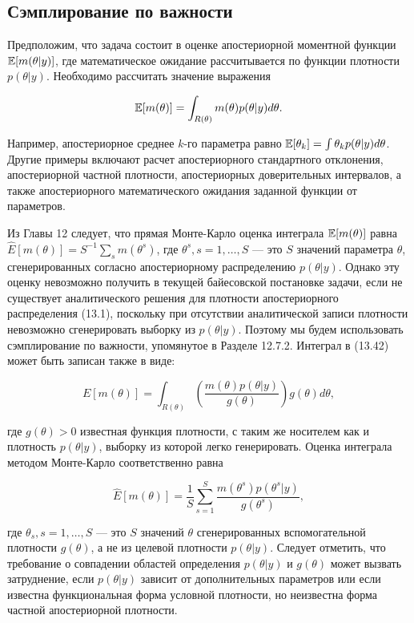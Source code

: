 \subsection{Сэмплирование по важности}

Предположим, что задача состоит в оценке апостериорной  моментной функции $\mathbb{E}[m(\theta|y)]$, где математическое ожидание рассчитывается по функции плотности $p(\theta|y)$. Необходимо рассчитать значение выражения

\begin{equation}
\mathbb{E}[m(\theta)]=\int_{R(\theta)}m(\theta)p(\theta|y)d\theta.
\end{equation}

Например, апостериорное среднее $k$-го параметра  равно $\mathbb{E}[\theta_k]=\int{\theta_{k}}p(\theta|y)d\theta$. Другие примеры включают  расчет апостериорного стандартного отклонения,  апостериорной частной плотности, апостериорных доверительных интервалов, а также апостериорного математического ожидания заданной функции от параметров.


Из Главы 12 следует, что прямая Монте-Карло оценка интеграла $\mathbb{E}[m(\theta)]$ равна $\hat{E}[m(\theta)]=S^{-1}\sum_{s}m(\theta^s)$, где $\theta^s, s=1,\ldots ,S$ --- это $S$ значений параметра $\theta$, сгенерированных согласно  апостериорному распределению $p(\theta|y)$. Однако эту оценку невозможно получить в текущей байесовской постановке задачи, если не существует аналитического решения для плотности апостериорного распределения (13.1), поскольку при отсутствии аналитической записи плотности невозможно сгенерировать выборку из $p(\theta|y)$. Поэтому мы будем использовать сэмплирование по важности, упомянутое в Разделе 12.7.2. Интеграл в (13.42) может быть записан также в виде:

\begin{equation}
E[m(\theta)]=\int_{R(\theta)}\left(\dfrac{m(\theta)p(\theta|y)}{g(\theta)}\right)g(\theta)d\theta, 
\end{equation}

где $g(\theta)>0$ известная функция плотности, с таким же носителем как и плотность $p(\theta|y)$, выборку из которой легко генерировать. Оценка интеграла методом Монте-Карло соответственно равна

\[
\hat{E}[m(\theta)]=\dfrac{1}{S}\sum^S_{s=1}\dfrac{m(\theta^s)p(\theta^s|y)}{g(\theta^s)},
\]

где $\theta_s, s=1,\ldots ,S$ --- это $S$ значений $\theta$ сгенерированных вспомогательной плотности $g(\theta)$, а не из целевой плотности $p(\theta|y)$. Следует отметить, что требование о совпадении областей определения $p(\theta|y)$ и $g(\theta)$ может вызвать затруднение, если $p(\theta|y)$ зависит от дополнительных параметров или если известна функциональная форма условной плотности, но неизвестна форма частной апостериорной плотности.

